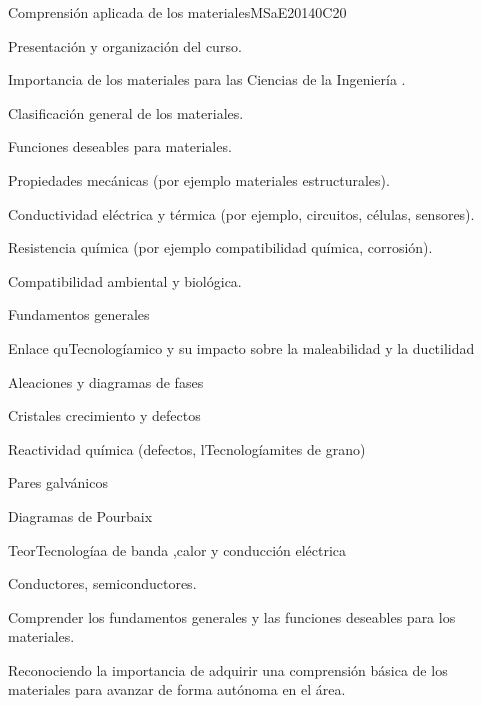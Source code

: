 \begin{syllabus}
\begin{unit}{Comprensión aplicada de los materiales}{}{MSaE2014}{0}{C20}
\begin{topics}
      \item Presentación y organización del curso.
      \item Importancia de los materiales para las Ciencias de la Ingeniería .
      \item Clasificación general de los materiales.
      \item Funciones deseables para materiales.
	  \begin{subtopics}
	      \item Propiedades mecánicas (por ejemplo materiales estructurales).
	      \item Conductividad eléctrica y térmica (por ejemplo, circuitos, células, sensores).
	      \item Resistencia química (por ejemplo compatibilidad química, corrosión).
	      \item Compatibilidad ambiental y biológica.
	  \end{subtopics}
      \item Fundamentos generales
	  \begin{subtopics}
	      \item Enlace quTecnologíamico y su impacto sobre la maleabilidad y la ductilidad
	      \item Aleaciones y diagramas de fases
	      \item Cristales crecimiento y defectos
	      \item Reactividad química (defectos, lTecnologíamites de grano)
	      \item Pares galvánicos
	      \item Diagramas de Pourbaix
	      \item TeorTecnologíaa de banda ,calor y conducción eléctrica
	      \item Conductores, semiconductores.
	  \end{subtopics}      
\end{topics}
   \begin{learningoutcomes}
    \item Comprender los fundamentos generales y las funciones deseables para los materiales.
    \item Reconociendo la importancia de adquirir una comprensión básica de los materiales para avanzar de forma autónoma en el área.
   \end{learningoutcomes}
\end{unit}


\end{syllabus}
